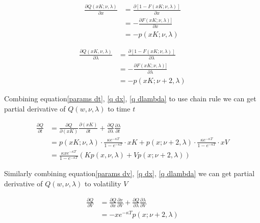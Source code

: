 \begin{equation}\label{q dx}
    \begin{aligned}
        \frac{\partial Q(xK; \nu, \lambda)}{\partial x}&=\frac{\partial[1-F(xK; \nu, \lambda)]}{\partial x} \\ 
        &=-\frac{\partial F(xK; \nu, \lambda)]}{\partial x} \\
        &=-p(xK; \nu, \lambda)
        \end{aligned}
\end{equation}

\begin{equation}\label{q dlambda}
    \begin{aligned}
        \frac{\partial Q(xK, \nu, \lambda)}{\partial \lambda}&=\frac{\partial[1-F(xK ; \nu, \lambda)]}{\partial \lambda}\\
        &=-\frac{\partial F(xK ; \nu, \lambda)]}{\partial \lambda} \\
        &=-p(xK ; \nu+2, \lambda)
    \end{aligned}
\end{equation}

Combining equation\eqref{params dt}, \eqref{q dx}, \eqref{q dlambda} to use chain rule we can get partial derivative of $Q(w, \nu, \lambda)$ to time $t$

\begin{equation}\label{q dt}
    \begin{aligned}
        \frac{\partial Q}{\partial t}&= \frac{\partial Q}{\partial (xK)}\frac{\partial (xK)}{\partial t} + \frac{\partial Q}{\partial \lambda} \frac{\partial \lambda}{\partial t} \\
        &= p(xK; \nu, \lambda) \cdot \frac{\kappa e^{-\kappa T}}{1 - e^{-\kappa T}}\cdot xK + p(x ; \nu+2, \lambda) \cdot\frac{\kappa e^{-\kappa T}}{1 - e^{-\kappa T}}\cdot x V \\
        &= \frac{\kappa x e^{-\kappa T}}{1 - e^{-\kappa T}} \left( K p(x, \nu, \lambda)  + V p(x ; \nu+2, \lambda)\right)
    \end{aligned}
\end{equation}

\noindent Similarly combining equation\eqref{params dv}, \eqref{q dx}, \eqref{q dlambda} we can get partial derivative of $Q(w, \nu, \lambda)$ to volatility $V$

\begin{equation}\label{q dv}
    \begin{aligned}
        \frac{\partial Q}{\partial V}&= \frac{\partial Q}{\partial x}\frac{\partial x}{\partial V} + \frac{\partial Q}{\partial \lambda} \frac{\partial \lambda}{\partial V} \\
        &= - x e^{-\kappa T} p(x ; \nu+2, \lambda)
    \end{aligned}
\end{equation}

